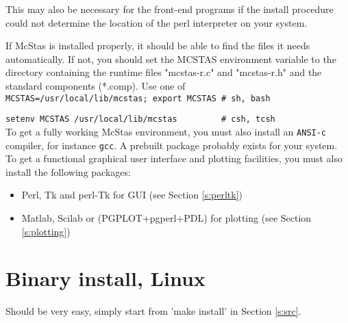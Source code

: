 This may also be necessary for the front-end programs if the install
procedure could not determine the location of the perl interpreter on
your system.

If McStas is installed properly, it should be able to find the files it
needs automatically. If not, you should set the MCSTAS environment
variable to the directory containing the runtime files "mcstas-r.c" and
"mcstas-r.h" and the standard components (*.comp). Use one of\\

  \verb+MCSTAS=/usr/local/lib/mcstas; export MCSTAS # sh, bash+

  \verb+setenv MCSTAS /usr/local/lib/mcstas         # csh, tcsh+\\

%
%
%
To get a fully working McStas environment, you must also install an 
\texttt{ANSI-c} compiler, for instance \texttt{gcc}. A prebuilt package
probably exists for your system.
To get a functional graphical user interface and plotting facilities,
you must also install the following packages:
\begin{itemize}
\item{Perl, Tk and perl-Tk for GUI (see Section \ref{s:perltk})}
\item{Matlab, Scilab or (PGPLOT+pgperl+PDL) for plotting (see Section \ref{s:plotting})}
\end{itemize}
\section{Binary install, Linux}
\label{s:linbin}
Should be very easy, simply start from 'make install' in Section \ref{s:src}.
